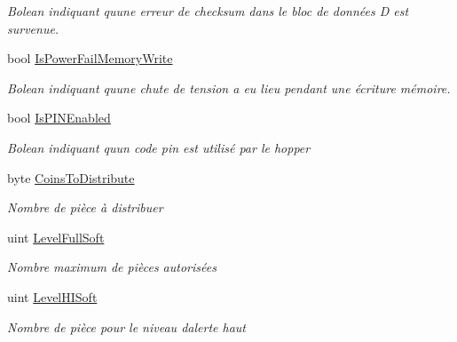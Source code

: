 \begin{DoxyCompactItemize}
\begin{DoxyCompactList}\small\item\em Bolean indiquant qu\textquotesingle{}une erreur de checksum dans le bloc de données D est survenue. \end{DoxyCompactList}\item 
bool \mbox{\hyperlink{class_device_library_1_1_c_hopper_ab6ddbdf218466891ec4df5b618f22b57}{Is\+Power\+Fail\+Memory\+Write}}
\begin{DoxyCompactList}\small\item\em Bolean indiquant qu\textquotesingle{}une chute de tension a eu lieu pendant une écriture mémoire. \end{DoxyCompactList}\item 
bool \mbox{\hyperlink{class_device_library_1_1_c_hopper_a6cba5628502ed179dc886abe0e553879}{Is\+P\+I\+N\+Enabled}}
\begin{DoxyCompactList}\small\item\em Bolean indiquant qu\textquotesingle{}un code pin est utilisé par le hopper \end{DoxyCompactList}\item 
byte \mbox{\hyperlink{class_device_library_1_1_c_hopper_a11dafc48a8a680909486f10a61b80de1}{Coins\+To\+Distribute}}
\begin{DoxyCompactList}\small\item\em Nombre de pièce à distribuer \end{DoxyCompactList}\item 
uint \mbox{\hyperlink{class_device_library_1_1_c_hopper_ade03b189fd3b60ae0be1b0ecc4b58177}{Level\+Full\+Soft}}
\begin{DoxyCompactList}\small\item\em Nombre maximum de pièces autorisées \end{DoxyCompactList}\item 
uint \mbox{\hyperlink{class_device_library_1_1_c_hopper_add0b0bb819e03109708b70ceecc31106}{Level\+H\+I\+Soft}}
\begin{DoxyCompactList}\small\item\em Nombre de pièce pour le niveau d\textquotesingle{}alerte haut \end{DoxyCompactList}\item 

\end{DoxyCompactItemize}
